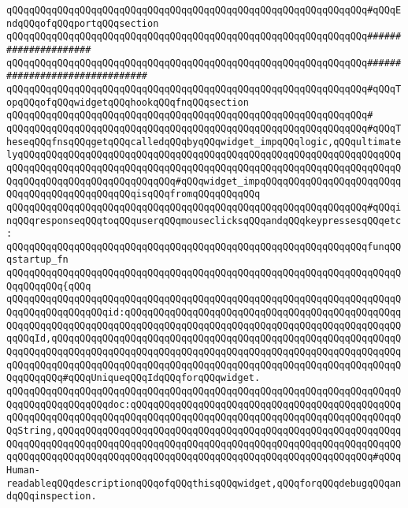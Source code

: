 \verb|qQQqqQQqqQQqqQQqqQQqqQQqqQQqqQQqqQQqqQQqqQQqqQQqqQQqqQQqqQQqqQQq#qQQqEndqQQqofqQQqportqQQqsection|\newline
\verb|qQQqqQQqqQQqqQQqqQQqqQQqqQQqqQQqqQQqqQQqqQQqqQQqqQQqqQQqqQQqqQQq#####################|\newline
\newline
\newline
\verb|qQQqqQQqqQQqqQQqqQQqqQQqqQQqqQQqqQQqqQQqqQQqqQQqqQQqqQQqqQQqqQQq###############################|\newline
\verb|qQQqqQQqqQQqqQQqqQQqqQQqqQQqqQQqqQQqqQQqqQQqqQQqqQQqqQQqqQQqqQQq#qQQqTopqQQqofqQQqwidgetqQQqhookqQQqfnqQQqsection|\newline
\verb|qQQqqQQqqQQqqQQqqQQqqQQqqQQqqQQqqQQqqQQqqQQqqQQqqQQqqQQqqQQqqQQq#|\newline
\verb|qQQqqQQqqQQqqQQqqQQqqQQqqQQqqQQqqQQqqQQqqQQqqQQqqQQqqQQqqQQqqQQq#qQQqTheseqQQqfnsqQQqgetqQQqcalledqQQqbyqQQqwidget_impqQQqlogic,qQQqultimatelyqQQqqQQqqQQqqQQqqQQqqQQqqQQqqQQqqQQqqQQqqQQqqQQqqQQqqQQqqQQqqQQqqQQqqQQqqQQqqQQqqQQqqQQqqQQqqQQqqQQqqQQqqQQqqQQqqQQqqQQqqQQqqQQqqQQqqQQqqQQqqQQqqQQqqQQqqQQqqQQqqQQqqQQq#qQQqwidget_impqQQqqQQqqQQqqQQqqQQqqQQqqQQqqQQqqQQqqQQqqQQqqQQqisqQQqfromqQQqqQQqqQQq|\newline
\verb|qQQqqQQqqQQqqQQqqQQqqQQqqQQqqQQqqQQqqQQqqQQqqQQqqQQqqQQqqQQqqQQq#qQQqinqQQqresponseqQQqtoqQQquserqQQqmouseclicksqQQqandqQQqkeypressesqQQqetc:|\newline
\newline
\verb|qQQqqQQqqQQqqQQqqQQqqQQqqQQqqQQqqQQqqQQqqQQqqQQqqQQqqQQqqQQqqQQqfunqQQqstartup_fn|\newline
\verb|qQQqqQQqqQQqqQQqqQQqqQQqqQQqqQQqqQQqqQQqqQQqqQQqqQQqqQQqqQQqqQQqqQQqqQQqqQQqqQQq{qQQq|\newline
\verb|qQQqqQQqqQQqqQQqqQQqqQQqqQQqqQQqqQQqqQQqqQQqqQQqqQQqqQQqqQQqqQQqqQQqqQQqqQQqqQQqqQQqqQQqid:qQQqqQQqqQQqqQQqqQQqqQQqqQQqqQQqqQQqqQQqqQQqqQQqqQQqqQQqqQQqqQQqqQQqqQQqqQQqqQQqqQQqqQQqqQQqqQQqqQQqqQQqqQQqqQQqqQQqqQQqqQQqId,qQQqqQQqqQQqqQQqqQQqqQQqqQQqqQQqqQQqqQQqqQQqqQQqqQQqqQQqqQQqqQQqqQQqqQQqqQQqqQQqqQQqqQQqqQQqqQQqqQQqqQQqqQQqqQQqqQQqqQQqqQQqqQQqqQQqqQQqqQQqqQQqqQQqqQQqqQQqqQQqqQQqqQQqqQQqqQQqqQQqqQQqqQQqqQQqqQQqqQQqqQQqqQQqqQQq#qQQqUniqueqQQqIdqQQqforqQQqwidget.|\newline
\verb|qQQqqQQqqQQqqQQqqQQqqQQqqQQqqQQqqQQqqQQqqQQqqQQqqQQqqQQqqQQqqQQqqQQqqQQqqQQqqQQqqQQqqQQqdoc:qQQqqQQqqQQqqQQqqQQqqQQqqQQqqQQqqQQqqQQqqQQqqQQqqQQqqQQqqQQqqQQqqQQqqQQqqQQqqQQqqQQqqQQqqQQqqQQqqQQqqQQqqQQqqQQqqQQqqQQqString,qQQqqQQqqQQqqQQqqQQqqQQqqQQqqQQqqQQqqQQqqQQqqQQqqQQqqQQqqQQqqQQqqQQqqQQqqQQqqQQqqQQqqQQqqQQqqQQqqQQqqQQqqQQqqQQqqQQqqQQqqQQqqQQqqQQqqQQqqQQqqQQqqQQqqQQqqQQqqQQqqQQqqQQqqQQqqQQqqQQqqQQqqQQqqQQqqQQq#qQQqHuman-readableqQQqdescriptionqQQqofqQQqthisqQQqwidget,qQQqforqQQqdebugqQQqandqQQqinspection.|\newline
